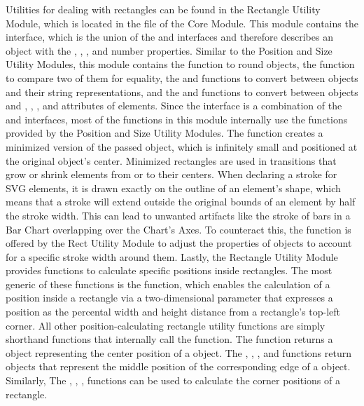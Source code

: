 Utilities for dealing with rectangles can be found in the Rectangle Utility Module, which is located in the  file of the Core Module.
This module contains the  interface, which is the union of the  and  interfaces and therefore describes an object with the , , , and  number properties.
Similar to the Position and Size Utility Modules, this module contains the  function to round  objects, the  function to compare two of them for equality, the  and  functions to convert between  objects and their string representations, and the  and  functions to convert between objects and , , , and  attributes of elements.
Since the  interface is a combination of the  and  interfaces, most of the functions in this module internally use the functions provided by the Position and Size Utility Modules.
The  function creates a minimized version of the passed  object, which is infinitely small and positioned at the original  object's center.
Minimized rectangles are used in transitions that grow or shrink  elements from or to their centers. 
When declaring a stroke for SVG elements, it is drawn exactly on the outline of an element's shape, which means that a stroke will extend outside the original bounds of an element by half the stroke width.
This can lead to unwanted artifacts like the stroke of bars in a Bar Chart overlapping over the Chart's Axes.
To counteract this, the  function is offered by the Rect Utility Module to adjust the properties of  objects to account for a specific stroke width around them.
Lastly, the Rectangle Utility Module provides functions to calculate specific positions inside rectangles.
The most generic of these functions is the  function, which enables the calculation of a position inside a rectangle via a two-dimensional parameter that expresses a position as the percental width and height distance from a rectangle's top-left corner.
All other position-calculating rectangle utility functions are simply shorthand functions that internally call the  function.
The  function returns a  object representing the center position of a  object.
The , , , and  functions return  objects that represent  the middle position of the corresponding edge of a  object.
Similarly, The , , ,  functions can be used to calculate the corner positions of a rectangle.


